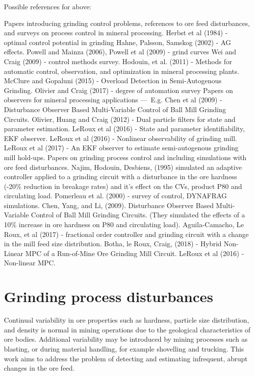 Possible references for above:
\begin{outline}
	\1 Papers introducing grinding control problems, references to ore feed disturbances, and surveys on process control in mineral processing.
	\2 Herbst et al (1984) - optimal control potential in grinding
	\2 Hahne, Palsson, Samskog (2002) - AG effects.
	\2 Powell and Mainza (2006), Powell et al (2009) - grind curves
	\2 Wei and Craig (2009) - control methods survey.
	\2 Hodouin, et al. (2011) - Methods for automatic control, observation, and optimization in mineral processing plants.
	\2 McClure and Gopaluni (2015) - Overload Detection in Semi-Autogenous Grinding.
	\2 Olivier and Craig (2017) - degree of automation survey
	\1 Papers on observers for mineral processing applications — E.g. 
	\2 Chen et al (2009) - Disturbance Observer Based Multi-Variable Control of Ball Mill Grinding Circuits. %
	\2 Olivier, Huang and Craig (2012) - Dual particle filters for state and parameter estimation.
	\2 LeRoux et al (2016) - State and parameter identifiability, EKF observer.
	\2 LeRoux et al (2016) - Nonlinear observability of grinding mill.
	\2 LeRoux et al (2017) - An EKF observer to estimate semi-autogenous grinding mill hold-ups.
	\1 Papers on grinding process control and including simulations with ore feed disturbances.
	\2 Najim, Hodouin, Desbiens, (1995) simulated an adaptive controller applied to a grinding circuit with a disturbance in the ore hardness (-20\% reduction in breakage rates) and it's effect on the CVs, product P80 and circulating load.
	\2 Pomerleau et al. (2000) - survey of control, DYNAFRAG simulations.
	\2 Chen, Yang, and Li, (2009). Disturbance Observer Based Multi-Variable Control of Ball Mill Grinding Circuits. (They simulated the effects of a 10\% increase in ore hardness on P80 and circulating load).
	\2 Aguila-Camacho, Le Roux, et al (2017) - fractional order controller and grinding circuit with a change in the mill feed size distribution.
	\2 Botha, le Roux, Craig, (2018) - Hybrid Non-Linear MPC of a Run-of-Mine Ore Grinding Mill Circuit.
	\2 LeRoux et al (2016) - Non-linear MPC.

\end{outline}


\section*{Grinding process disturbances}

Continual variability in ore properties such as hardness, particle size distribution, and density is normal in mining operations due to the geological characteristics of ore bodies. Additional variability may be introduced by mining processes such as blasting, or during material handling, for example shovelling and trucking. This work aims to address the problem of detecting and estimating infrequent, abrupt changes in the ore feed.

